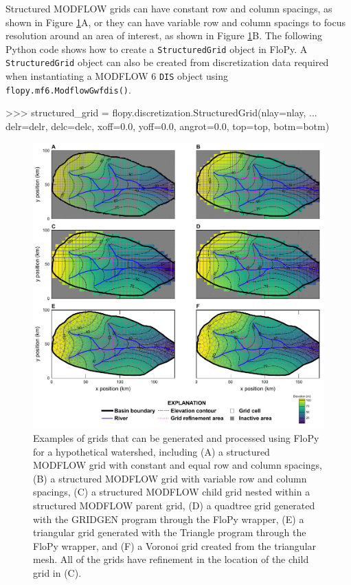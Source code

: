 \documentclass[12pt, oneside]{article}  	%
\begin{document}
Structured MODFLOW grids can have constant row and column spacings, as shown in Figure \ref{fig:grids}A, or they can have variable row and column spacings to focus resolution around an area of interest, as shown in Figure \ref{fig:grids}B. The following Python code shows how to create a \texttt{StructuredGrid} object in FloPy. A \texttt{StructuredGrid} object can also be created from discretization data required when instantiating a MODFLOW 6 \texttt{DIS} object using \texttt{flopy.mf6.ModflowGwfdis()}. 

\begin{python}
>>> structured_grid = flopy.discretization.StructuredGrid(nlay=nlay, 
... delr=delr, delc=delc, xoff=0.0, yoff=0.0, angrot=0.0, top=top, botm=botm)
\end{python}


\begin{figure}[ht!]
	\begin{center}
		\includegraphics{figures/grids_geoprocessing.pdf}
	\end{center}
	\caption{Examples of grids that can be generated and processed using FloPy for a hypothetical watershed, including (A) a structured MODFLOW grid with constant and equal row and column spacings, (B) a structured MODFLOW grid with variable row and column spacings, (C) a structured MODFLOW child grid nested within a structured MODFLOW parent grid, (D) a quadtree grid generated with the GRIDGEN program \citep{gridgen} through the FloPy wrapper, (E) a triangular grid generated with the Triangle program \citep{trianglemesh} through the FloPy wrapper, and (F) a Voronoi grid created from the triangular mesh. All of the grids have refinement in the location of the child grid in (C).}
	\label{fig:grids}
\end{figure}
\end{document}
